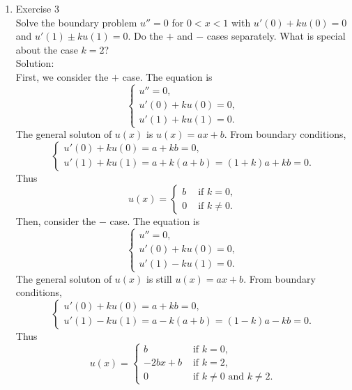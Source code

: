\documentclass[12pt]{article}%
\begin{document}
\begin{enumerate}
\begin{enumerate}
        \item Exercise 3 \smallskip \\
        Solve the boundary problem $u'' = 0$ for $0 < x < 1$ with $u'\left(0\right) + ku\left(0\right) = 0$ and $u'\left(1\right) \pm ku\left(1\right) = 0$.  Do the $+$ and $-$ cases separately.  What is special about the case $k=2$? \\
        Solution: \\
      First, we consider the $+$ case. The equation is 
      \begin{equation*}
        \begin{cases}
            u'' = 0,
            \\
            u'\left(0\right) + ku\left(0\right) = 0,
            \\
            u'\left(1\right) + ku\left(1\right) = 0.
        \end{cases}
      \end{equation*}
    The general soluton of $u(x)$ is $u(x)=ax+b$. From boundary conditions, 
    \begin{equation*}
        \begin{cases}
            u'(0)+ku(0)=a+kb=0,
            \\
            u'(1)+ku(1)=a+k(a+b)=(1+k)a+kb=0.
        \end{cases}
    \end{equation*}
    Thus 
    $$
    u(x)=\begin{cases}
        b & \text{ if } k = 0, \\
        0 & \text{ if } k \ne 0.
      \end{cases}
   $$
   Then, consider the $-$ case. The equation is 
   \begin{equation*}
    \begin{cases}
        u'' = 0,
        \\
        u'\left(0\right) + ku\left(0\right) = 0,
        \\
        u'\left(1\right) - ku\left(1\right) = 0.
    \end{cases}
  \end{equation*}
  The general soluton of $u(x)$ is still $u(x)=ax+b$. From boundary conditions, 
    \begin{equation*}
        \begin{cases}
            u'(0)+ku(0)=a+kb=0,
            \\
            u'(1)-ku(1)=a-k(a+b)=(1-k)a-kb=0.
        \end{cases}
    \end{equation*}
    Thus $$
    u(x)=\begin{cases}
        b & \text{ if } k = 0, \\
        -2bx+b & \text{ if } k = 2, \\
        0 & \text{ if } k \ne 0 \text{ and } k \ne 2. 
      \end{cases}
   $$
        

\end{enumerate}
\end{enumerate}
\end{document}
